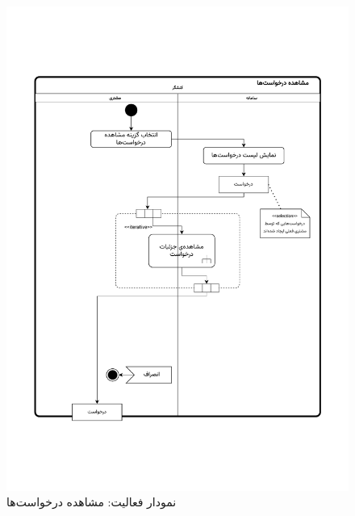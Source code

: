 \begin{figure}[ht!]
	\centering
	\includegraphics[scale=0.8, page=1]{figs/OOD-activity-viewreq.pdf}
	\caption{نمودار فعالیت: مشاهده درخواست‌ها}
\end{figure}
\FloatBarrier
\newpage

